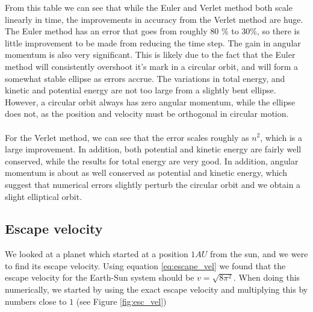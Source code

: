 \documentclass[%
 reprint,
 nobalance,
 amsmath,amssymb,
 aps,
]{revtex4-1}
\begin{document}
From this table we can see that while the Euler and Verlet method both scale linearly in time, the improvements in accuracy from the Verlet method are huge. \\ The Euler method has an error that goes from roughly 80 \% to 30\%, so there is little improvement to be made from reducing the time step. The gain in angular momentum is also very significant. This is likely due to the fact that the Euler method will consistently overshoot it's mark in a circular orbit, and will form a somewhat stable ellipse as errors accrue. The variations in total energy, and kinetic and potential energy are not too large from a slightly bent ellipse. However, a circular orbit always has zero angular momentum, while the ellipse does not, as the position and velocity must be orthogonal in circular motion. \\ \\
For the Verlet method, we can see that the error scales roughly as $n^{2}$, which is a large improvement. In addition, both potential and kinetic energy are fairly well conserved, while the results for total energy are very good. In addition, angular momentum is about as well conserved as potential and kinetic energy, which suggest that numerical errors slightly perturb the circular orbit and we obtain a slight elliptical orbit.




\subsection{\label{sec:Sub1.5}Escape velocity}

We looked at a planet which started at a position $1AU$ from the sun, and we were to find its escape velocity. Using equation \ref{eq:escape_vel} we found that the escape velocity for the Earth-Sun system should be $v = \sqrt{8\pi^2}$. When doing this numerically, we started by using the exact escape velocity and multiplying this by numbers close to $1$ (see Figure \ref{fig:esc_vel})
\end{document}
